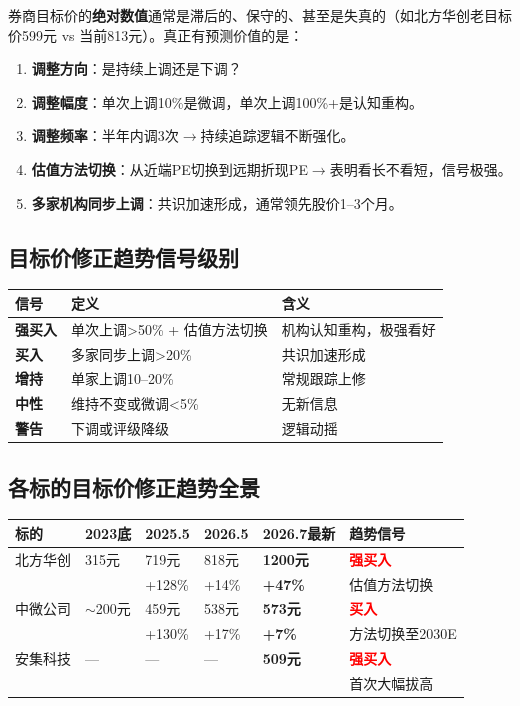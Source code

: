 \documentclass[a4paper,11pt,fontset=none]{ctexart}
\begin{document}
券商目标价的\textbf{绝对数值}通常是滞后的、保守的、甚至是失真的（如北方华创老目标价599元 vs 当前813元）。真正有预测价值的是：
\begin{enumerate}
  \item \textbf{调整方向}：是持续上调还是下调？
  \item \textbf{调整幅度}：单次上调10\%是微调，单次上调100\%+是认知重构。
  \item \textbf{调整频率}：半年内调3次$\to$持续追踪逻辑不断强化。
  \item \textbf{估值方法切换}：从近端PE切换到远期折现PE$\to$表明看长不看短，信号极强。
  \item \textbf{多家机构同步上调}：共识加速形成，通常领先股价1--3个月。
\end{enumerate}

\subsection*{目标价修正趋势信号级别}

\begin{tabularx}{\textwidth}{L{2cm}L{4cm}X}
\toprule
\textbf{信号} & \textbf{定义} & \textbf{含义} \\
\midrule
\textbf{强买入} & 单次上调>50\% + 估值方法切换 & 机构认知重构，极强看好 \\
\textbf{买入} & 多家同步上调>20\% & 共识加速形成 \\
\textbf{增持} & 单家上调10--20\% & 常规跟踪上修 \\
\textbf{中性} & 维持不变或微调<5\% & 无新信息 \\
\textbf{警告} & 下调或评级降级 & 逻辑动摇 \\
\bottomrule
\end{tabularx}

\subsection*{各标的目标价修正趋势全景}

\begin{exhibitbox}
\begin{tabularx}{\textwidth}{L{2cm}L{1.8cm}L{1.8cm}L{1.8cm}L{2.5cm}X}
\toprule
\textbf{标的} & \textbf{2023底} & \textbf{2025.5} & \textbf{2026.5} & \textbf{2026.7最新} & \textbf{趋势信号} \\
\midrule
北方华创 & 315元 & 719元 & 818元 & \textbf{1200元} & \textcolor{red}{\textbf{强买入}} \\
 & & +128\% & +14\% & \textbf{+47\%} & 估值方法切换 \\
\midrule
中微公司 & $\sim$200元 & 459元 & 538元 & \textbf{573元} & \textcolor{red}{\textbf{买入}} \\
 & & +130\% & +17\% & \textbf{+7\%} & 方法切换至2030E \\
\midrule
安集科技 & --- & --- & --- & \textbf{509元} & \textcolor{red}{\textbf{强买入}} \\
 & & & & & 首次大幅拔高 \\
\bottomrule
\end{tabularx}
\end{exhibitbox}
\end{document}
